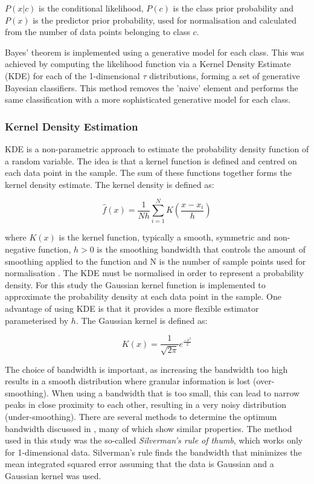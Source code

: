 $P(x|c)$ is the conditional likelihood, $P(c)$ is the class prior probability and $P(x)$ is the predictor prior probability, used for normalisation and calculated from the number of data points belonging to class $c$.

Bayes' theorem is implemented using a generative model for each class. This was achieved by computing the likelihood function via a Kernel Density Estimate (KDE) for each of the 1-dimensional $\tau$ distributions, forming a set of generative Bayesian classifiers. This method removes the 'naive' element and performs the same classification with a more sophisticated generative model for each class.

\subsubsection{Kernel Density Estimation}

KDE is a non-parametric approach to estimate the probability density function of a random variable. The idea is that a kernel function is defined and centred on each data point in the sample. The sum of these functions together forms the kernel density estimate. The kernel density is defined as:
    
\begin{equation} \label{eq2}
    \hat{f}(x) = \frac{1}{Nh}  \sum_{i=1}^{N} K \left( \frac{x - x_i}{h} \right)
\end{equation}

where $K(x)$ is the kernel function, typically a smooth, symmetric and non-negative function, $h > 0$ is the smoothing bandwidth that controls the amount of smoothing applied to the function and N is the number of sample points used for normalisation \cite{kde}. The KDE must be normalised in order to represent a probability density. For this study the Gaussian kernel function is implemented to approximate the probability density at each data point in the sample. One advantage of using KDE is that it provides a more flexible estimator parameterised by $h$. The Gaussian kernel is defined as:
    
\begin{equation} \label{eq3}
    K(x) = \frac{1}{\sqrt{2\pi}} e^{\frac{-x^2}{2}}
\end{equation}

The choice of bandwidth is important, as increasing the bandwidth too high results in a smooth distribution where granular information is lost (over-smoothing). When using a bandwidth that is too small, this can lead to narrow peaks in close proximity to each other, resulting in a very noisy distribution (under-smoothing). There are several methods to determine the optimum bandwidth discussed in \cite{bandwidth-selection-methods}, many of which show similar properties. The method used in this study was the so-called \textit{Silverman's rule of thumb}, which works only for 1-dimensional data. Silverman's rule finds the bandwidth that minimizes the mean integrated squared error assuming that the data is Gaussian and a Gaussian kernel was used.


